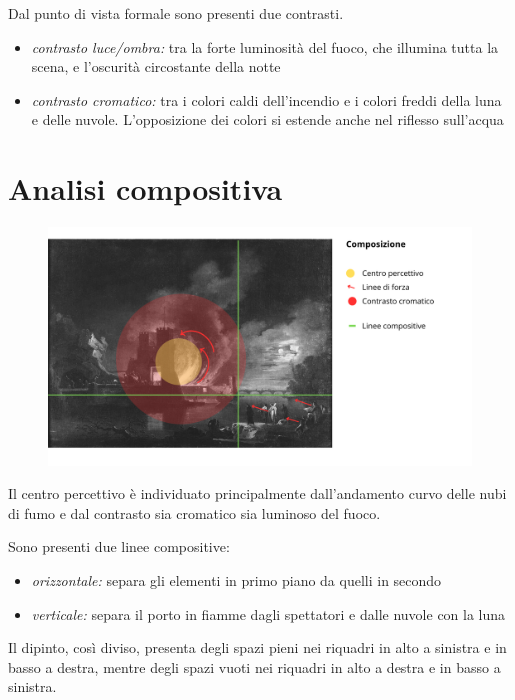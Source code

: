 \documentclass[12pt]{article}
\begin{document}
Dal punto di vista formale sono presenti due contrasti. 
\begin{itemize}
    \item \textit{contrasto luce/ombra:} tra la forte luminosità del fuoco, che illumina tutta la scena, e l'oscurità circostante della notte
    \item \textit{contrasto cromatico:} tra i colori caldi dell'incendio e i colori freddi della luna e delle nuvole. L'opposizione dei colori si estende anche nel riflesso sull'acqua
\end{itemize}

\newpage
\section*{Analisi compositiva}
\begin{figure}[h]
    \includegraphics[scale=0.31]{analisi_compositiva}
    \centering
\end{figure}

Il centro percettivo è individuato principalmente dall'andamento curvo delle nubi di fumo e dal contrasto sia cromatico sia luminoso del fuoco.

\vspace{1em}

Sono presenti due linee compositive:
\begin{itemize}
    \item \textit{orizzontale:} separa gli elementi in primo piano da quelli in secondo
    \item \textit{verticale:} separa il porto in fiamme dagli spettatori e dalle nuvole con la luna
\end{itemize}
Il dipinto, così diviso, presenta degli spazi pieni nei riquadri in alto a sinistra e in basso a destra, mentre degli spazi vuoti nei riquadri in alto a destra e in basso a sinistra.
\end{document}
